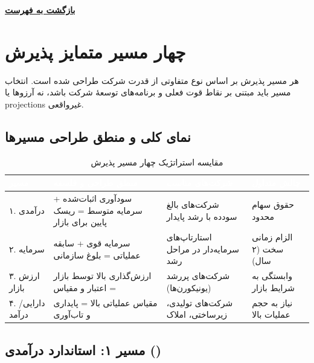 \documentclass[10pt]{report}
\newcommand{\lat}[1]{\lr{#1}}
\newcommand{\returnhome}{\vspace{0.5em}\noindent\protect\hyperlink{home}{\colorbox{conceptBox}{\color{headerColor}\textbf{بازگشت به فهرست}}}\par}
\begin{document}
\returnhome

\clearpage
\chapter{چهار مسیر متمایز پذیرش}
\hypertarget{pathways}{}

\begin{keyconceptbox}
هر مسیر پذیرش بر اساس نوع متفاوتی از قدرت شرکت طراحی شده است. انتخاب مسیر باید مبتنی بر نقاط قوت فعلی و برنامه‌های توسعۀ شرکت باشد، نه آرزوها یا projections غیرواقعی.
\end{keyconceptbox}

\section{نمای کلی و منطق طراحی مسیرها}

\begin{table}[H]
\centering
\caption{مقایسه استراتژیک چهار مسیر پذیرش}
\label{tab:pathways_overview}
\begin{threeparttable}
\begin{tabularx}{\textwidth}{H{3cm} X P{2.8cm} P{2.8cm}}
\toprule
{}
\textcolor{white}{\textbf{مسیر}} & \textcolor{white}{\textbf{منطق طراحی و فلسفه}} & \textcolor{white}{\textbf{شرکت‌های مناسب}} & \textcolor{white}{\textbf{چالش متداول}} \\
\midrule
{}
۱. درآمدی & سودآوری اثبات‌شده + سرمایه متوسط = ریسک پایین برای بازار & شرکت‌های بالغ سودده با رشد پایدار & حقوق سهام محدود \\
۲. سرمایه & سرمایه قوی + سابقه عملیاتی = بلوغ سازمانی & استارتاپ‌های سرمایه‌دار در مراحل رشد & الزام زمانی سخت (۲ سال) \\
۳. ارزش بازار & ارزش‌گذاری بالا توسط بازار = اعتبار و مقیاس & شرکت‌های پررشد (یونیکورن‌ها) & وابستگی به شرایط بازار \\
۴. دارایی/درآمد & مقیاس عملیاتی بالا = پایداری و تاب‌آوری & شرکت‌های تولیدی، زیرساختی، املاک & نیاز به حجم عملیات بالا \\
\bottomrule
\end{tabularx}
\end{threeparttable}
\end{table}
\clearpage

\section{مسیر ۱: استاندارد درآمدی (\lat{Income Standard})}
\end{document}
